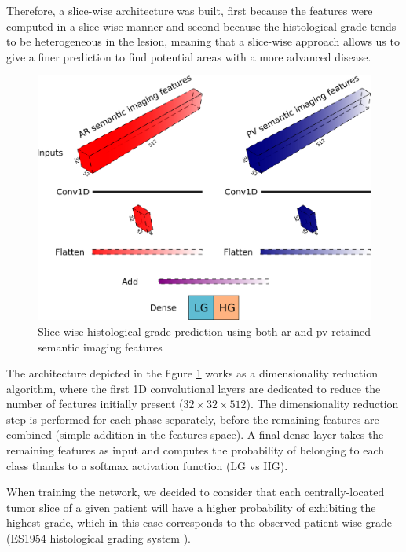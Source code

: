 Therefore, a slice-wise architecture was built, first because the
features were computed in a slice-wise manner and second because the
histological grade tends to be heterogeneous in the lesion, meaning that
a slice-wise approach allows us to give a finer prediction to find
potential areas with a more advanced disease.


\begin{figure}[th!]
\centering
\includegraphics[width=0.9\linewidth]{../HistologicalGradePrediction/images/gradpredictionArchitecture}
\caption{Slice-wise histological grade prediction using both \ac{ar} and \ac{pv} retained semantic imaging features}
\label{fig:gradpredictionArchitecture}
\end{figure}



The architecture depicted in the figure \ref{fig:gradpredictionArchitecture} works as a dimensionality
reduction algorithm, where the first 1D convolutional layers are dedicated to
reduce the number of features initially present ($ 32\times32\times512 $). The
dimensionality reduction step is performed for each phase separately,
before the remaining features are combined (simple addition in the
features space).
A final dense layer takes the remaining features as input and computes
the probability of belonging to each class thanks to a softmax activation
function (LG vs HG).

When training the network, we decided to consider that each
centrally-located tumor slice of a given patient will have a higher
probability of exhibiting the highest grade, which in this case
corresponds to the observed patient-wise grade (ES1954 histological grading system \cite{EdmondsonHA1954}).

